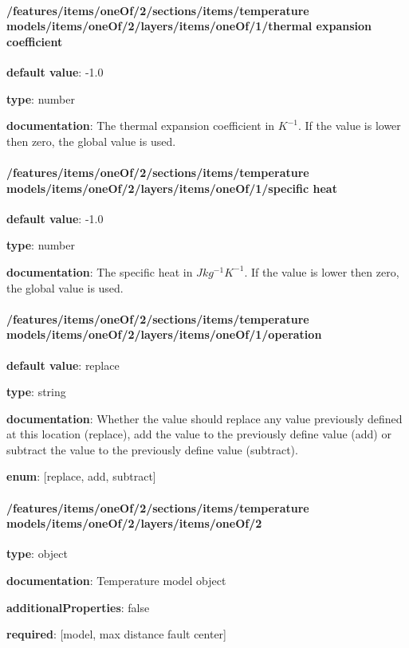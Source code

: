 \begin{itemized}
\end{itemized}\paragraph{/features/items/oneOf/2/sections/items/temperature models/items/oneOf/2/layers/items/oneOf/1/thermal expansion coefficient} \begin{itemized}
\item {\bf default value}: -1.0
\item {\bf type}: number
\item {\bf documentation}: The thermal expansion coefficient in $K^{-1}$. If the value is lower then zero, the global value is used.
\end{itemized}\paragraph{/features/items/oneOf/2/sections/items/temperature models/items/oneOf/2/layers/items/oneOf/1/specific heat} \begin{itemized}
\item {\bf default value}: -1.0
\item {\bf type}: number
\item {\bf documentation}: The specific heat in $J kg^{-1} K^{-1}$. If the value is lower then zero, the global value is used.
\end{itemized}\paragraph{/features/items/oneOf/2/sections/items/temperature models/items/oneOf/2/layers/items/oneOf/1/operation} \begin{itemized}
\item {\bf default value}: replace
\item {\bf type}: string
\item {\bf documentation}: Whether the value should replace any value previously defined at this location (replace), add the value to the previously define value (add) or subtract the value to the previously define value (subtract).
\item {\bf enum}: [replace, add, subtract]\end{itemized}\paragraph{/features/items/oneOf/2/sections/items/temperature models/items/oneOf/2/layers/items/oneOf/2} \begin{itemized}
\item {\bf type}: object
\item {\bf documentation}: Temperature model object
\item {\bf additionalProperties}: false
\item {\bf required}: [model, max distance fault center]\end{itemized}

